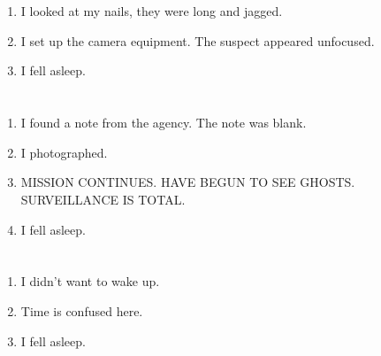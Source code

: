 \documentclass{article}
\begin{document}
    \newpage
    
    \section{}
    
    \begin{enumerate}
    
    \item I looked at my nails, they were long and jagged.\\
    
    \item I set up the camera equipment. The suspect appeared unfocused.\\
    
    \item I fell asleep.\\
    
    \end{enumerate}
     
    \newpage
    
    \section{}
    
    \begin{enumerate}
    
    \item I found a note from the agency. The note was blank.\\
    
    \item I photographed.\\
    
    \item MISSION CONTINUES. HAVE BEGUN TO SEE GHOSTS. SURVEILLANCE IS TOTAL.\\
    
    \item I fell asleep.\\
    
    \end{enumerate}
     
    \newpage
    
    \section{}
    
    \begin{enumerate}
    
    \item I didn't want to wake up.\\
    
    \item Time is confused here.\\
    
    \item I fell asleep.\\
    
    \end{enumerate}
     
\end{document}
